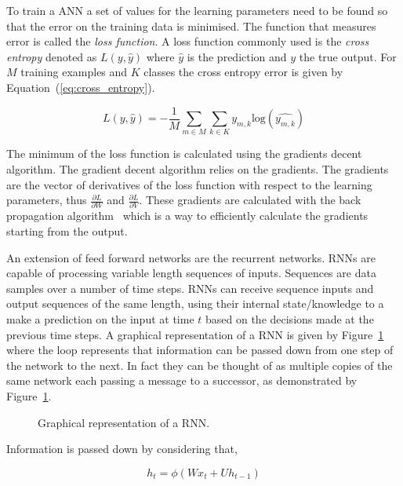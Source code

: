 To train a ANN a set of values for the learning parameters need to be found so
that the error on the training data is minimised. The function that measures
error is called the \textit{loss function}. A loss function commonly used is the
\textit{cross entropy} denoted as \(L(y, \hat{y})\) where \(\hat{y}\) is the
prediction and \(y\) the true output. For \(M\) training examples and \(K\)
classes the cross entropy error is given by Equation~(\ref{eq:cross_entropy}).

\begin{equation}\label{eq:cross_entropy}
    L(y, \hat{y}) = - \frac{1}{M} \sum_{m\in M} \sum_{k \in K} y_{m, k} \text{log}(\hat{y_{m, k}})
\end{equation}

The minimum of the loss function is calculated using the gradients decent
algorithm. The gradient decent algorithm relies on the gradients. The gradients
are the vector of derivatives of the loss function with respect to the learning
parameters, thus \(\frac{\partial{L}}{\partial{W}}\) and
\(\frac{\partial{L}}{\partial{V}}\). These gradients are calculated with the
back propagation algorithm~\cite{Wythoff1993} which is a way to efficiently
calculate the gradients starting from the output.

An extension of feed forward networks are the recurrent networks. RNNs are
capable of processing variable length sequences of inputs. Sequences are data
samples over a number of time steps. RNNs can receive sequence inputs and output
sequences of the same length, using their internal state/knowledge to a make a
prediction on the input at time \(t\) based on the decisions made at the
previous time steps. A graphical representation of a RNN is given by
Figure~\ref{fig:rnn} where the loop represents that information can be passed
down from one step of the network to the next. In fact they can be thought of as
multiple copies of the same network each passing a message to a successor, as
demonstrated by Figure~\ref{fig:rnn}.

\begin{figure}[!htbp]
    \centering
    
    \caption{Graphical representation of a RNN.}\label{fig:rnn}
\end{figure}

Information is passed down by considering that,

\begin{equation*}
    h_t = \phi(Wx_t + Uh_{t-1})
\end{equation*}

